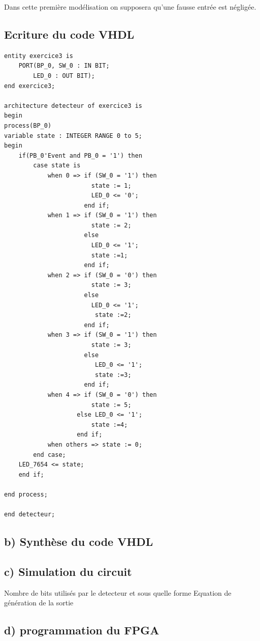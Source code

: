 \documentclass[11pt]{report}
\begin{document}
Dans cette première modélisation on supposera qu'une fausse entrée est négligée. 

\subsection{Ecriture du code VHDL}

\begin{lstlisting}
entity exercice3 is
	PORT(BP_0, SW_0 : IN BIT;
		LED_0 : OUT BIT);
end exercice3;

architecture detecteur of exercice3 is
begin
process(BP_0)
variable state : INTEGER RANGE 0 to 5;
begin
	if(PB_0'Event and PB_0 = '1') then
		case state is
			when 0 => if (SW_0 = '1') then 
						state := 1; 
						LED_0 <= '0'; 
					  end if;
			when 1 => if (SW_0 = '1') then 
						state := 2; 
					  else 
					  	LED_0 <= '1'; 
						state :=1; 
					  end if;
			when 2 => if (SW_0 = '0') then 
						state := 3; 
					  else 
					  	LED_0 <= '1';
					  	 state :=2; 
					  end if;
			when 3 => if (SW_0 = '1') then 
						state := 3; 
					  else
					  	 LED_0 <= '1'; 
					  	 state :=3; 
					  end if;
			when 4 => if (SW_0 = '0') then 
						state := 5; 
					else LED_0 <= '1'; 
						state :=4;
					end if;
			when others => state := 0;
		end case;
	LED_7654 <= state;
	end if;

end process;

end detecteur;

\end{lstlisting}


\subsection{ b) Synthèse du code VHDL }
 
  \subsection{ c) Simulation du circuit}
  
  Nombre de bits utilisés par le detecteur et sous quelle forme
  Equation de génération de la sortie
  
  
   \subsection{ d) programmation du FPGA}
\end{document}
